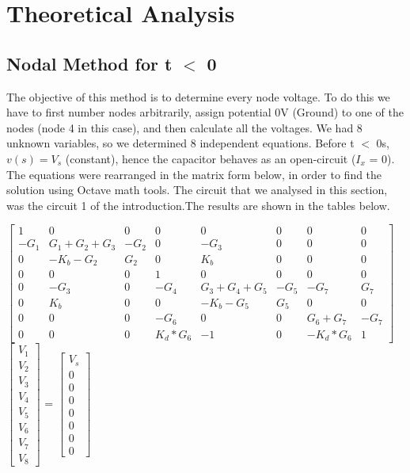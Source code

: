 \section{Theoretical Analysis}
\label{sec:analysis}

\subsection{Nodal Method for t $<$ 0}

The objective of this method is to  determine every node voltage. To do this we have to first number nodes arbitrarily, assign potential 0V (Ground) to one of the nodes (node 4 in this case), and then calculate all the voltages. We had 8 unknown variables, so we determined 8 independent equations. Before t $<$ 0s, $v(s) = V_s$ (constant), hence the capacitor behaves as an open-circuit ($I_x$ = 0). The equations were rearranged in the matrix form below, in order to find the solution using Octave math tools. The circuit that we analysed in this section, was the circuit 1 of the introduction.The results are shown in the tables below.

\begin{center}
$\begin{bmatrix}
1 & 0 & 0 & 0 & 0 & 0 & 0 & 0\\
-G_1 & G_1+G_2+G_3 & -G_2 & 0 & -G_3 & 0 & 0 & 0\\
0 & -K_b-G_2 & G_2 & 0 & K_b & 0 & 0 & 0\\
0 & 0 & 0 & 1 & 0 & 0 & 0 & 0\\
0 & -G_3 & 0 & -G_4 & G_3+G_4+G_5 & -G_5 & -G_7 & G_7\\
0 & K_b & 0 & 0 & -K_b-G_5 & G_5 & 0 & 0 \\
0 & 0 & 0 & -G_6 & 0 & 0 & G_6+G_7 & -G_7\\
0 & 0 & 0 & K_d*G_6 & -1 & 0 & -K_d*G_6 & 1
\end{bmatrix}$
$\begin{bmatrix}
V_1 \\ V_2 \\ V_3 \\ V_4 \\ V_5 \\ V_6 \\ V_7 \\ V_8
\end{bmatrix}$
= 
$\begin{bmatrix}
V_s \\ 0 \\ 0 \\ 0 \\ 0 \\ 0 \\ 0 \\ 0
\end{bmatrix}$
\end{center}

